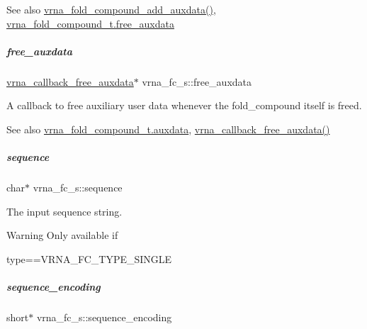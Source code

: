 \begin{DoxySeeAlso}{See also}
\hyperlink{group__fold__compound_gafc44c76a1aacf61bfccb8cd698772b98}{vrna\+\_\+fold\+\_\+compound\+\_\+add\+\_\+auxdata()}, \hyperlink{group__fold__compound_a8e84dbabab016ecd74da6c38cb94e816}{vrna\+\_\+fold\+\_\+compound\+\_\+t.\+free\+\_\+auxdata} 
\end{DoxySeeAlso}
\mbox{\label{group__fold__compound_a8e84dbabab016ecd74da6c38cb94e816}} 
\subparagraph{\texorpdfstring{free\+\_\+auxdata}{free\_auxdata}}
{\footnotesize\ttfamily \hyperlink{group__fold__compound_ga7806651f51b195013839a218b3bbd5a3}{vrna\+\_\+callback\+\_\+free\+\_\+auxdata}$\ast$ vrna\+\_\+fc\+\_\+s\+::free\+\_\+auxdata}



A callback to free auxiliary user data whenever the fold\+\_\+compound itself is free\textquotesingle{}d. 

\begin{DoxySeeAlso}{See also}
\hyperlink{group__fold__compound_a20048e0c369e9f24b55423d600037c68}{vrna\+\_\+fold\+\_\+compound\+\_\+t.\+auxdata}, \hyperlink{group__fold__compound_ga7806651f51b195013839a218b3bbd5a3}{vrna\+\_\+callback\+\_\+free\+\_\+auxdata()} 
\end{DoxySeeAlso}
\mbox{\label{group__fold__compound_a87f6abcda89cfb7a486c97e1f5371525}} 
\subparagraph{\texorpdfstring{sequence}{sequence}}
{\footnotesize\ttfamily char$\ast$ vrna\+\_\+fc\+\_\+s\+::sequence}



The input sequence string. 

\begin{DoxyWarning}{Warning}
Only available if\begin{DoxyVerb}type==VRNA_FC_TYPE_SINGLE \end{DoxyVerb}
 
\end{DoxyWarning}
\mbox{\label{group__fold__compound_a9934bdb695d35a3544285cbcc19f9763}} 
\subparagraph{\texorpdfstring{sequence\+\_\+encoding}{sequence\_encoding}}
{\footnotesize\ttfamily short$\ast$ vrna\+\_\+fc\+\_\+s\+::sequence\+\_\+encoding}



